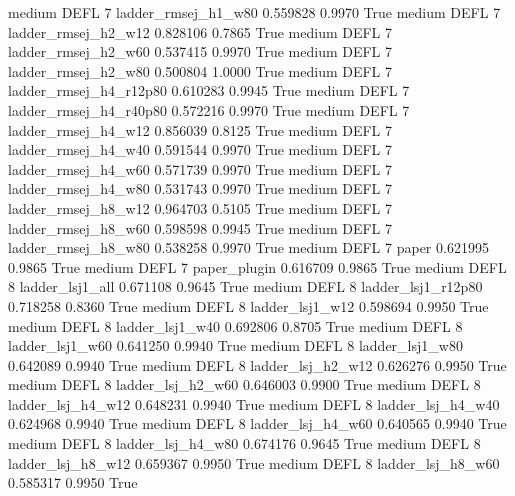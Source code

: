     medium     DEFL                 7    ladder_rmsej_h1_w80   0.559828      0.9970    True
    medium     DEFL                 7    ladder_rmsej_h2_w12   0.828106      0.7865    True
    medium     DEFL                 7    ladder_rmsej_h2_w60   0.537415      0.9970    True
    medium     DEFL                 7    ladder_rmsej_h2_w80   0.500804      1.0000    True
    medium     DEFL                 7 ladder_rmsej_h4_r12p80   0.610283      0.9945    True
    medium     DEFL                 7 ladder_rmsej_h4_r40p80   0.572216      0.9970    True
    medium     DEFL                 7    ladder_rmsej_h4_w12   0.856039      0.8125    True
    medium     DEFL                 7    ladder_rmsej_h4_w40   0.591544      0.9970    True
    medium     DEFL                 7    ladder_rmsej_h4_w60   0.571739      0.9970    True
    medium     DEFL                 7    ladder_rmsej_h4_w80   0.531743      0.9970    True
    medium     DEFL                 7    ladder_rmsej_h8_w12   0.964703      0.5105    True
    medium     DEFL                 7    ladder_rmsej_h8_w60   0.598598      0.9945    True
    medium     DEFL                 7    ladder_rmsej_h8_w80   0.538258      0.9970    True
    medium     DEFL                 7                  paper   0.621995      0.9865    True
    medium     DEFL                 7           paper_plugin   0.616709      0.9865    True
    medium     DEFL                 8        ladder_lsj1_all   0.671108      0.9645    True
    medium     DEFL                 8     ladder_lsj1_r12p80   0.718258      0.8360    True
    medium     DEFL                 8        ladder_lsj1_w12   0.598694      0.9950    True
    medium     DEFL                 8        ladder_lsj1_w40   0.692806      0.8705    True
    medium     DEFL                 8        ladder_lsj1_w60   0.641250      0.9940    True
    medium     DEFL                 8        ladder_lsj1_w80   0.642089      0.9940    True
    medium     DEFL                 8      ladder_lsj_h2_w12   0.626276      0.9950    True
    medium     DEFL                 8      ladder_lsj_h2_w60   0.646003      0.9900    True
    medium     DEFL                 8      ladder_lsj_h4_w12   0.648231      0.9940    True
    medium     DEFL                 8      ladder_lsj_h4_w40   0.624968      0.9940    True
    medium     DEFL                 8      ladder_lsj_h4_w60   0.640565      0.9940    True
    medium     DEFL                 8      ladder_lsj_h4_w80   0.674176      0.9645    True
    medium     DEFL                 8      ladder_lsj_h8_w12   0.659367      0.9950    True
    medium     DEFL                 8      ladder_lsj_h8_w60   0.585317      0.9950    True
